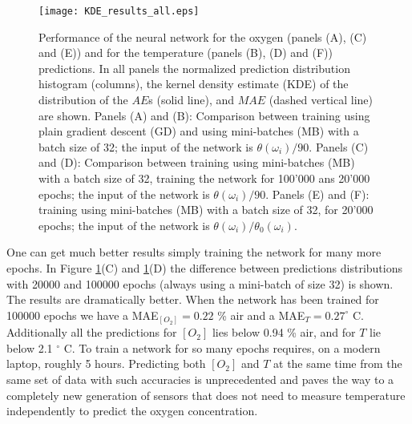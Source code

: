 \documentclass[9pt,twocolumn,twoside,pdftex]{optica}
\begin{document}
\begin{figure}[htbp]
\centering
\texttt{[image: KDE\_results\_all.eps]}
\caption{Performance of the neural network for the oxygen (panels (A), (C) and (E)) and for the temperature (panels (B), (D) and (F)) predictions. In all panels the normalized prediction distribution histogram (columns), the kernel density estimate (KDE) of the distribution of the $AE$s (solid line), and $MAE$ (dashed vertical line) are shown. Panels (A) and (B): Comparison between training using plain gradient descent (GD) and using mini-batches (MB) with a batch size of 32; the input of the network is $\theta(\omega_i)/90$. Panels (C) and (D): Comparison between training using mini-batches (MB) with a batch size of 32, training the network for 100'000 ans 20'000 epochs; the input of the network is $\theta(\omega_i)/90$. Panels (E) and (F): training using mini-batches (MB) with a batch size of 32, for 20'000 epochs; the input of the network is $\theta(\omega_i)/\theta_0(\omega_i)$.}
\label{fig:KDE_results_all}
\end{figure}


One can get much better results simply training the network for many more epochs. In Figure \ref{fig:KDE_results_all}(C) and \ref{fig:KDE_results_all}(D) the difference between predictions distributions with 20000 and 100000 epochs (always using a mini-batch of size 32) is shown. The results are dramatically better. When the network has been trained for 100000 epochs we have a MAE$_{[O_2]}=0.22$ \% air and a MAE$_{T}=0.27^\circ$ C. Additionally all the predictions for $[O_2]$ lies below 0.94 \% air, and for $T$ lie below 2.1 $^\circ$ C. To train a network for so many epochs requires, on a modern laptop, roughly 5 hours. Predicting both $[O_2]$ and $T$ at the same time from the same set of data with such accuracies is unprecedented and paves the way to a completely new generation of sensors that does not need to measure temperature independently to predict the oxygen concentration.
\end{document}
